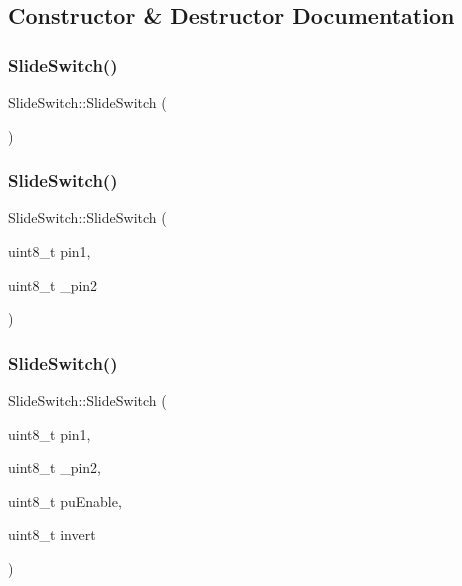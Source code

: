 \subsection{Constructor \& Destructor Documentation}
\mbox{\label{class_slide_switch_a5b0ed9a670728dd2619eacc48a53d25f}} 
\subsubsection{\texorpdfstring{Slide\+Switch()}{SlideSwitch()}\hspace{0.1cm}{\footnotesize\ttfamily [1/3]}}
{\footnotesize\ttfamily Slide\+Switch\+::\+Slide\+Switch (\begin{DoxyParamCaption}{ }\end{DoxyParamCaption})}

\mbox{\label{class_slide_switch_a00c9284ec86c53602afd988faacb02a6}} 
\subsubsection{\texorpdfstring{Slide\+Switch()}{SlideSwitch()}\hspace{0.1cm}{\footnotesize\ttfamily [2/3]}}
{\footnotesize\ttfamily Slide\+Switch\+::\+Slide\+Switch (\begin{DoxyParamCaption}\item[{uint8\+\_\+t}]{pin1,  }\item[{uint8\+\_\+t}]{\+\_\+pin2 }\end{DoxyParamCaption})}

\mbox{\label{class_slide_switch_a0806b870d5fb6bfb22b82b6f0146795e}} 
\subsubsection{\texorpdfstring{Slide\+Switch()}{SlideSwitch()}\hspace{0.1cm}{\footnotesize\ttfamily [3/3]}}
{\footnotesize\ttfamily Slide\+Switch\+::\+Slide\+Switch (\begin{DoxyParamCaption}\item[{uint8\+\_\+t}]{pin1,  }\item[{uint8\+\_\+t}]{\+\_\+pin2,  }\item[{uint8\+\_\+t}]{pu\+Enable,  }\item[{uint8\+\_\+t}]{invert }\end{DoxyParamCaption})}



